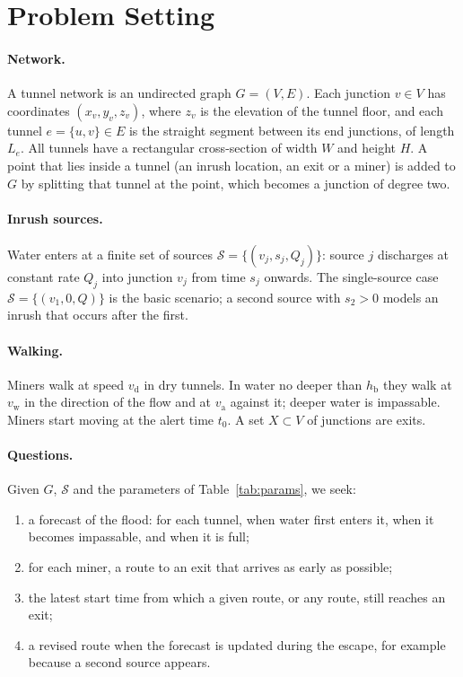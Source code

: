 \documentclass[11pt,a4paper]{article}
\theoremstyle{plain}
\theoremstyle{definition}
\theoremstyle{remark}
\newcommand{\hb}{h_{\mathrm{b}}}
\newcommand{\vd}{v_{\mathrm{d}}}
\newcommand{\vw}{v_{\mathrm{w}}}
\newcommand{\va}{v_{\mathrm{a}}}
\begin{document}
\section{Problem Setting}\label{sec:setting}

\paragraph{Network.} A tunnel network is an undirected graph $G=(V,E)$. Each junction $v \in V$ has coordinates $(x_v, y_v, z_v)$, where $z_v$ is the elevation of the tunnel floor, and each tunnel $e = \{u,v\} \in E$ is the straight segment between its end junctions, of length $L_e$. All tunnels have a rectangular cross-section of width $W$ and height $H$. A point that lies inside a tunnel (an inrush location, an exit or a miner) is added to $G$ by splitting that tunnel at the point, which becomes a junction of degree two.

\paragraph{Inrush sources.} Water enters at a finite set of sources $\mathcal{S} = \{(v_j, s_j, Q_j)\}$: source $j$ discharges at constant rate $Q_j$ into junction $v_j$ from time $s_j$ onwards. The single-source case $\mathcal{S} = \{(v_1, 0, Q)\}$ is the basic scenario; a second source with $s_2 > 0$ models an inrush that occurs after the first.

\paragraph{Walking.} Miners walk at speed $\vd$ in dry tunnels. In water no deeper than $\hb$ they walk at $\vw$ in the direction of the flow and at $\va$ against it; deeper water is impassable. Miners start moving at the alert time $t_0$. A set $X \subset V$ of junctions are exits.

\paragraph{Questions.} Given $G$, $\mathcal{S}$ and the parameters of Table~\ref{tab:params}, we seek:
\begin{enumerate}[leftmargin=2em, itemsep=1pt, topsep=2pt, label=(\roman*)]
  \item a forecast of the flood: for each tunnel, when water first enters it, when it becomes impassable, and when it is full;
  \item for each miner, a route to an exit that arrives as early as possible;
  \item the latest start time from which a given route, or any route, still reaches an exit;
  \item a revised route when the forecast is updated during the escape, for example because a second source appears.
\end{enumerate}
\end{document}
